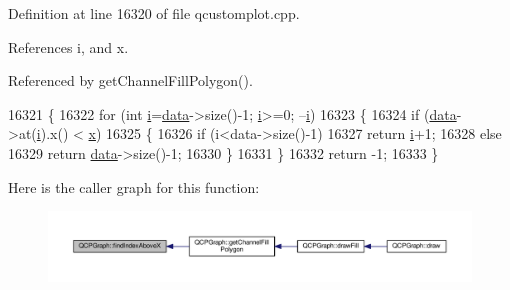 Definition at line 16320 of file qcustomplot.\+cpp.



References i, and x.



Referenced by get\+Channel\+Fill\+Polygon().


\begin{DoxyCode}
16321 \{
16322   \textcolor{keywordflow}{for} (\textcolor{keywordtype}{int} \hyperlink{_comparision_pictures_2_createtest_image_8m_a6f6ccfcf58b31cb6412107d9d5281426}{i}=\hyperlink{class_q_c_p_graph_a2f58436df4f86a2792b776a21642b3d9}{data}->size()-1; \hyperlink{_comparision_pictures_2_createtest_image_8m_a6f6ccfcf58b31cb6412107d9d5281426}{i}>=0; --\hyperlink{_comparision_pictures_2_createtest_image_8m_a6f6ccfcf58b31cb6412107d9d5281426}{i})
16323   \{
16324     \textcolor{keywordflow}{if} (\hyperlink{class_q_c_p_graph_a2f58436df4f86a2792b776a21642b3d9}{data}->at(\hyperlink{_comparision_pictures_2_createtest_image_8m_a6f6ccfcf58b31cb6412107d9d5281426}{i}).x() < \hyperlink{_comparision_pictures_2_createtest_image_8m_a9336ebf25087d91c818ee6e9ec29f8c1}{x})
16325     \{
16326       \textcolor{keywordflow}{if} (i<data->size()-1)
16327         \textcolor{keywordflow}{return} \hyperlink{_comparision_pictures_2_createtest_image_8m_a6f6ccfcf58b31cb6412107d9d5281426}{i}+1;
16328       \textcolor{keywordflow}{else}
16329         \textcolor{keywordflow}{return} \hyperlink{class_q_c_p_graph_a2f58436df4f86a2792b776a21642b3d9}{data}->size()-1;
16330     \}
16331   \}
16332   \textcolor{keywordflow}{return} -1;
16333 \}
\end{DoxyCode}


Here is the caller graph for this function\+:\nopagebreak
\begin{figure}[H]
\begin{center}
\leavevmode
\includegraphics[width=350pt]{class_q_c_p_graph_abab2a75b5e63630432bdd1f3b57f07fa_icgraph}
\end{center}
\end{figure}


\hypertarget{class_q_c_p_graph_adf50243f1df203883a2187089734bfcb}{}
